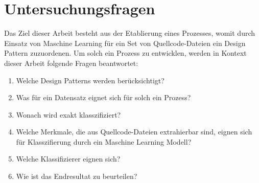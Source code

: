 \section{Untersuchungsfragen}

Das Ziel dieser Arbeit besteht aus der Etablierung eines Prozesses, womit durch Einsatz von Maschine Learning für ein Set von Quellcode-Dateien ein Design Pattern zuzuordenen.
Um solch ein Prozess zu entwicklen, werden in Kontext dieser Arbeit folgende Fragen beantwortet:

\begin{enumerate}
    \item Welche Design Patterns werden berücksichtigt?
    \item Was für ein Datensatz eignet sich für solch ein Prozess?
    \item Wonach wird exakt klasszifiziert?
    \item Welche Merkmale, die aus Quellcode-Dateien extrahierbar sind, eignen sich für Klasszifierung durch ein Maschine Learning Modell?  
    \item Welche Klassifizierer eignen sich?
    \item Wie ist das Endresultat zu beurteilen?
\end{enumerate}